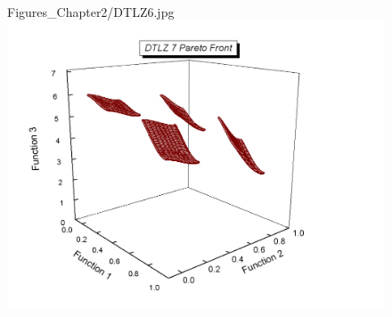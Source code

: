 \begin{figure}[H]
{Figures_Chapter2/DTLZ6.jpg}\
\includegraphics[scale=0.2]
{Figures_Chapter2/DTLZ7.jpg}
\end{figure}

